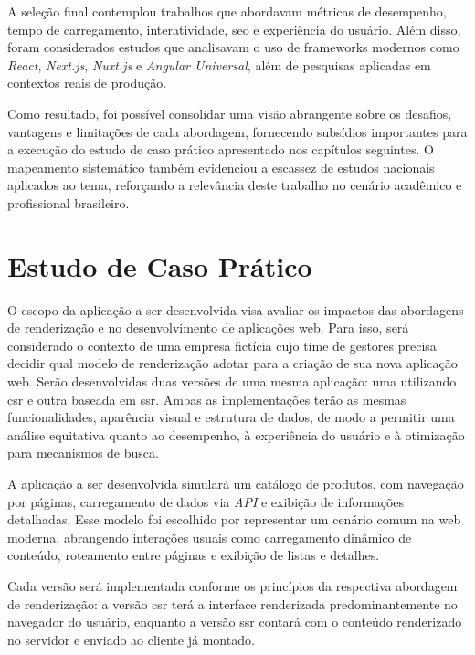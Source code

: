 A seleção final contemplou trabalhos que abordavam métricas de desempenho, tempo de carregamento, interatividade, \acrshort{seo} e experiência do usuário. Além disso, foram considerados estudos que analisavam o uso de frameworks modernos como \textit{React}, \textit{Next.js}, \textit{Nuxt.js} e \textit{Angular Universal}, além de pesquisas aplicadas em contextos reais de produção.

Como resultado, foi possível consolidar uma visão abrangente sobre os desafios, vantagens e limitações de cada abordagem, fornecendo subsídios importantes para a execução do estudo de caso prático apresentado nos capítulos seguintes. O mapeamento sistemático também evidenciou a escassez de estudos nacionais aplicados ao tema, reforçando a relevância deste trabalho no cenário acadêmico e profissional brasileiro.


\section{Estudo de Caso Prático}
\label{sec:estudo-de-caso-pratico}

O escopo da aplicação a ser desenvolvida visa avaliar os impactos das abordagens de renderização  e  no desenvolvimento de aplicações web. Para isso, será considerado o contexto de uma empresa fictícia cujo time de gestores precisa decidir qual modelo de renderização adotar para a criação de sua nova aplicação web. Serão desenvolvidas duas versões de uma mesma aplicação: uma utilizando \acrshort{csr} e outra baseada em \acrshort{ssr}. Ambas as implementações terão as mesmas funcionalidades, aparência visual e estrutura de dados, de modo a permitir uma análise equitativa quanto ao desempenho, à experiência do usuário e à otimização para mecanismos de busca.

A aplicação a ser desenvolvida simulará um catálogo de produtos, com navegação por páginas, carregamento de dados via \textit{API} e exibição de informações detalhadas. Esse modelo foi escolhido por representar um cenário comum na web moderna, abrangendo interações usuais como carregamento dinâmico de conteúdo, roteamento entre páginas e exibição de listas e detalhes.

Cada versão será implementada conforme os princípios da respectiva abordagem de renderização: a versão \acrshort{csr} terá a interface renderizada predominantemente no navegador do usuário, enquanto a versão \acrshort{ssr} contará com o conteúdo renderizado no servidor e enviado ao cliente já montado.

